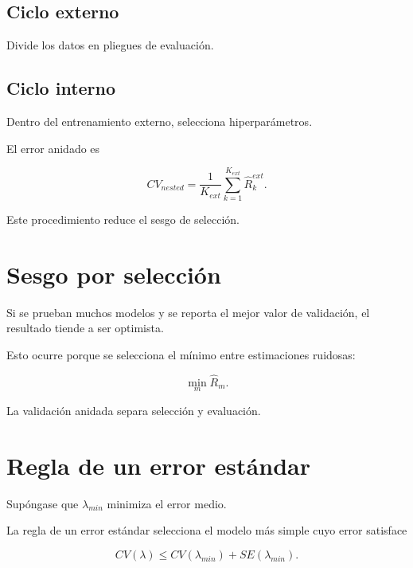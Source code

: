 \documentclass[
  spanish,
  10.5pt,
  letterpaper,
  DIV=11,
  numbers=noendperiod,
  oneside,
  open=any]{scrreprt}
\theoremstyle{definition}
\theoremstyle{definition}
\theoremstyle{plain}
\theoremstyle{remark}
\begin{document}
\subsection*{Ciclo externo}\label{ciclo-externo}

Divide los datos en pliegues de evaluación.

\subsection*{Ciclo interno}\label{ciclo-interno}

Dentro del entrenamiento externo, selecciona hiperparámetros.

El error anidado es

\[
CV_{nested}
=
\frac{1}{K_{ext}}
\sum_{k=1}^{K_{ext}}
\widehat{R}^{ext}_k.
\]

Este procedimiento reduce el sesgo de selección.

\section*{Sesgo por selección}\label{sesgo-por-selecciuxf3n}


Si se prueban muchos modelos y se reporta el mejor valor de validación,
el resultado tiende a ser optimista.

Esto ocurre porque se selecciona el mínimo entre estimaciones ruidosas:

\[
\min_m
\widehat{R}_m.
\]

La validación anidada separa selección y evaluación.

\section*{Regla de un error
estándar}\label{regla-de-un-error-estuxe1ndar}


Supóngase que \(\lambda_{min}\) minimiza el error medio.

La regla de un error estándar selecciona el modelo más simple cuyo error
satisface

\[
CV(\lambda)
\leq
CV(\lambda_{min})
+
SE(\lambda_{min}).
\]
\end{document}
